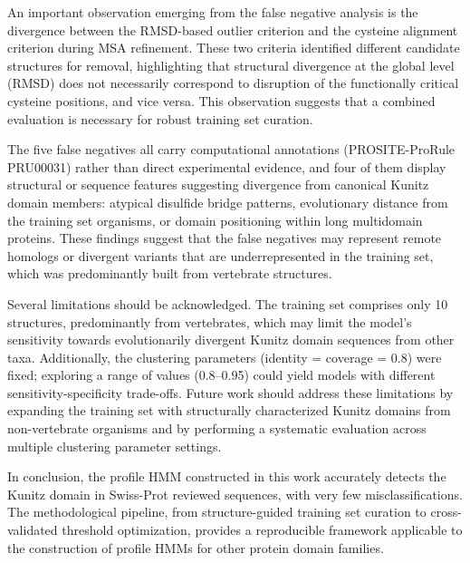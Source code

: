 \documentclass[11pt, a4paper]{article}
\begin{document}
An important observation emerging from the false negative 
analysis is the divergence between the RMSD-based outlier 
criterion and the cysteine alignment criterion during MSA 
refinement. These two criteria identified different 
candidate structures for removal, highlighting that 
structural divergence at the global level (RMSD) does not 
necessarily correspond to disruption of the functionally 
critical cysteine positions, and vice versa. This 
observation suggests that a combined evaluation is 
necessary for robust training set curation.

The five false negatives all carry computational 
annotations (PROSITE-ProRule PRU00031) rather than direct 
experimental evidence, and four of them display structural 
or sequence features suggesting divergence from canonical 
Kunitz domain members: atypical disulfide bridge patterns, 
evolutionary distance from the training set organisms, or 
domain positioning within long multidomain proteins. These 
findings suggest that the false negatives may represent 
remote homologs or divergent variants that are 
underrepresented in the training set, which was 
predominantly built from vertebrate structures.

Several limitations should be acknowledged. The training 
set comprises only 10 structures, predominantly from 
vertebrates, which may limit the model's sensitivity 
towards evolutionarily divergent Kunitz domain sequences 
from other taxa. Additionally, the clustering parameters 
(identity = coverage = 0.8) were fixed; exploring a range 
of values (0.8--0.95) could 
yield models with different sensitivity-specificity 
trade-offs. Future work should address these limitations 
by expanding the training set with structurally 
characterized Kunitz domains from non-vertebrate organisms 
and by performing a systematic evaluation across multiple 
clustering parameter settings.

In conclusion, the profile HMM constructed in this work 
accurately detects the Kunitz domain in Swiss-Prot reviewed 
sequences, with very few misclassifications. The 
methodological pipeline, from structure-guided training set 
curation to cross-validated threshold optimization, provides 
a reproducible framework applicable to the construction of 
profile HMMs for other protein domain families.

\nocite{*} 
\printbibliography
%

\clearpage
\end{document}
